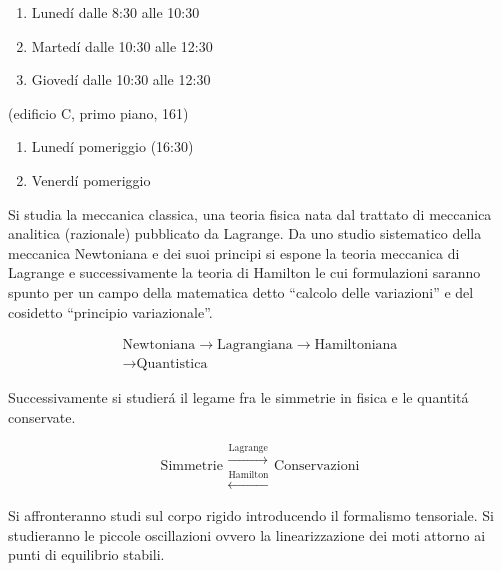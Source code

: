 





\begin{multicols}{3}

  \begin{enumerate}
  \item Luned\'i dalle 8:30 alle 10:30
  \item Marted\'i dalle 10:30 alle 12:30
  \item Gioved\'i dalle 10:30 alle 12:30
  \end{enumerate}
   (edificio C, primo piano, 161)
  \begin{enumerate}
  \item Luned\'i pomeriggio (16:30)
  \item Venerd\'i pomeriggio
  \end{enumerate}

  Si studia la meccanica classica, una teoria fisica nata dal trattato di
  meccanica analitica (razionale) pubblicato da Lagrange. Da uno studio
  sistematico della meccanica Newtoniana e dei suoi principi si espone la
  teoria meccanica di Lagrange e successivamente la teoria di Hamilton le cui
  formulazioni saranno spunto per un campo della matematica detto ``calcolo
  delle variazioni'' e del cosidetto ``principio variazionale''.

  \begin{equation}
    \begin{gathered}
      \text{Newtoniana} \to
      \text{Lagrangiana} \to
      \text{Hamiltoniana} \\
      \to \text{Quantistica}
    \end{gathered}
  \end{equation}

  Successivamente si studier\'a il legame fra le simmetrie in fisica e le
  quantit\'a conservate.

  \begin{equation}
    \text{Simmetrie}
    \begin{matrix}
      \xrightarrow{\text{Lagrange}} \\
      \xleftarrow{\text{Hamilton}}
    \end{matrix}
    \text{Conservazioni}
  \end{equation}

  Si affronteranno studi sul corpo rigido introducendo il formalismo
  tensoriale. Si studieranno le piccole oscillazioni ovvero la linearizzazione
  dei moti attorno ai punti di equilibrio stabili.


\end{multicols}
